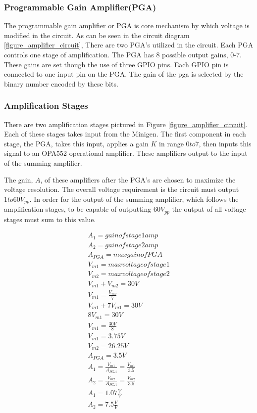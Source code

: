 \documentclass{article}	%
\begin{document}
\begin{multicols}{2}
\subsubsection{Programmable Gain Amplifier(PGA)}
The programmable gain amplifier or PGA is 
core mechanism by which voltage is modified in the circuit.
As can be seen in the circuit diagram \ref{figure_amplifier_circuit},
There are two PGA's utilized in the circuit.
Each PGA controls one stage of amplification.
The PGA has 8 possible output gains, 0-7.
These gains are set though the use of three GPIO pins.
Each GPIO pin is connected to one input pin on the PGA.
The gain of the pga is selected by the binary number encoded by 
these bits.

\subsubsection{Amplification Stages}
There are two amplification stages pictured in
Figure \ref{figure_amplifier_circuit}.
Each of these stages takes input from the Minigen.
The first component in each stage, the PGA,
takes this input,
applies a gain $K$ in range $0 to 7$, then
inputs this signal to an OPA552 operational amplifier.
These amplifiers output to the input of the summing amplifier.

The gain, $A$, of these amplifiers after the PGA's are chosen
to maximize the voltage resolution.
The overall voltage requirement is the circuit must output $1 to 60V_{pp}$.
In order for the output of the summing amplifier,
which follows the amplification stages,
to be capable of outputting $60V_{pp}$ the output of all voltage
stages must sum to this value.

\begin{gather*}
A_1 = gain of stage 1 amp\\ 
A_2 = gain of stage 2 amp\\
A_{PGA} = max gain of PGA\\
V_{m1} = max voltage of stage 1\\
V_{m2} = max voltage of stage 2\\
V_{m1} + V_{m2} = 30V\\
V_{m1} = \frac{V_{m2}}{7}\\
V_{m1} + 7V_{m1} = 30V\\
8V_{m1} = 30V\\
V_{m1} = \frac{30V}{8}\\
V_{m1} = 3.75V\\
V_{m2} = 26.25V\\
A_{PGA} = 3.5V\\
A_1 = \frac{V_{m1}}{A_{PGA}} = \frac{V_{m1}}{3.5}\\
A_2 = \frac{V_{m2}}{A_{PGA}} = \frac{V_{m2}}{3.5}\\
A_1 = 1.07\frac{V}{V}\\
A_2 = 7.5\frac{V}{V}\\
\end{gather*}


\end{multicols}
\end{document}

